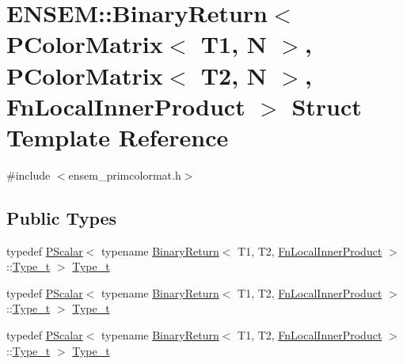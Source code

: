 \hypertarget{structENSEM_1_1BinaryReturn_3_01PColorMatrix_3_01T1_00_01N_01_4_00_01PColorMatrix_3_01T2_00_01N_8f6cd73d0788242d6be21a14b362f366}{}\section{E\+N\+S\+EM\+:\+:Binary\+Return$<$ P\+Color\+Matrix$<$ T1, N $>$, P\+Color\+Matrix$<$ T2, N $>$, Fn\+Local\+Inner\+Product $>$ Struct Template Reference}
\label{structENSEM_1_1BinaryReturn_3_01PColorMatrix_3_01T1_00_01N_01_4_00_01PColorMatrix_3_01T2_00_01N_8f6cd73d0788242d6be21a14b362f366}


{\ttfamily \#include $<$ensem\+\_\+primcolormat.\+h$>$}

\subsection*{Public Types}
\begin{DoxyCompactItemize}
\item 
typedef \mbox{\hyperlink{classENSEM_1_1PScalar}{P\+Scalar}}$<$ typename \mbox{\hyperlink{structENSEM_1_1BinaryReturn}{Binary\+Return}}$<$ T1, T2, \mbox{\hyperlink{structENSEM_1_1FnLocalInnerProduct}{Fn\+Local\+Inner\+Product}} $>$\+::\mbox{\hyperlink{structENSEM_1_1BinaryReturn_3_01PColorMatrix_3_01T1_00_01N_01_4_00_01PColorMatrix_3_01T2_00_01N_8f6cd73d0788242d6be21a14b362f366_a94506a87a1a1b8e9ecfc9d665acaa10b}{Type\+\_\+t}} $>$ \mbox{\hyperlink{structENSEM_1_1BinaryReturn_3_01PColorMatrix_3_01T1_00_01N_01_4_00_01PColorMatrix_3_01T2_00_01N_8f6cd73d0788242d6be21a14b362f366_a94506a87a1a1b8e9ecfc9d665acaa10b}{Type\+\_\+t}}
\item 
typedef \mbox{\hyperlink{classENSEM_1_1PScalar}{P\+Scalar}}$<$ typename \mbox{\hyperlink{structENSEM_1_1BinaryReturn}{Binary\+Return}}$<$ T1, T2, \mbox{\hyperlink{structENSEM_1_1FnLocalInnerProduct}{Fn\+Local\+Inner\+Product}} $>$\+::\mbox{\hyperlink{structENSEM_1_1BinaryReturn_3_01PColorMatrix_3_01T1_00_01N_01_4_00_01PColorMatrix_3_01T2_00_01N_8f6cd73d0788242d6be21a14b362f366_a94506a87a1a1b8e9ecfc9d665acaa10b}{Type\+\_\+t}} $>$ \mbox{\hyperlink{structENSEM_1_1BinaryReturn_3_01PColorMatrix_3_01T1_00_01N_01_4_00_01PColorMatrix_3_01T2_00_01N_8f6cd73d0788242d6be21a14b362f366_a94506a87a1a1b8e9ecfc9d665acaa10b}{Type\+\_\+t}}
\item 
typedef \mbox{\hyperlink{classENSEM_1_1PScalar}{P\+Scalar}}$<$ typename \mbox{\hyperlink{structENSEM_1_1BinaryReturn}{Binary\+Return}}$<$ T1, T2, \mbox{\hyperlink{structENSEM_1_1FnLocalInnerProduct}{Fn\+Local\+Inner\+Product}} $>$\+::\mbox{\hyperlink{structENSEM_1_1BinaryReturn_3_01PColorMatrix_3_01T1_00_01N_01_4_00_01PColorMatrix_3_01T2_00_01N_8f6cd73d0788242d6be21a14b362f366_a94506a87a1a1b8e9ecfc9d665acaa10b}{Type\+\_\+t}} $>$ \mbox{\hyperlink{structENSEM_1_1BinaryReturn_3_01PColorMatrix_3_01T1_00_01N_01_4_00_01PColorMatrix_3_01T2_00_01N_8f6cd73d0788242d6be21a14b362f366_a94506a87a1a1b8e9ecfc9d665acaa10b}{Type\+\_\+t}}
\end{DoxyCompactItemize}


